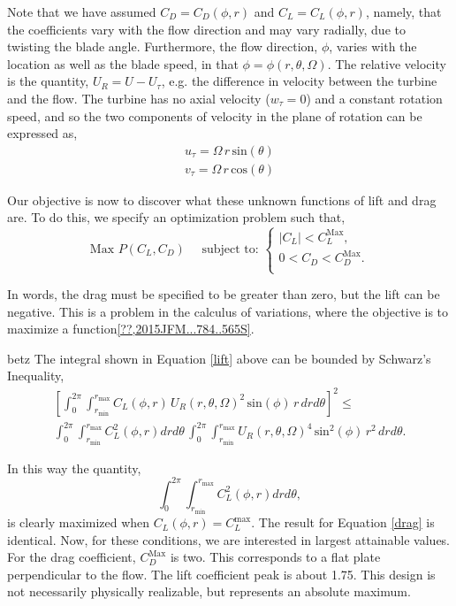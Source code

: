 Note that we have assumed $C_D = C_D(\phi,r)$ and $C_L = C_L(\phi,r)$,
namely, that the coefficients vary with the flow direction and may vary
radially, due to twisting the blade angle. Furthermore, the flow
direction, $\phi$, varies with the location as well as the blade speed,
in that $\phi=\phi(r,\theta,\Omega)$. The relative velocity is the
quantity, $U_R = U - U_\tau$, e.g. the difference in velocity between
the turbine and the flow. The turbine has no axial velocity ($w_\tau =
0$) and a constant rotation speed, and so the two components of velocity
in the plane of rotation can be expressed as,
\begin{align}
 u_\tau = \Omega \,r\, \text{sin}(\theta)\\
 v_\tau = \Omega \,r\, \text{cos}(\theta)
\end{align}

Our objective is now to discover what these unknown functions of lift
and drag are. To do this, we specify an optimization problem such that, 
\begin{equation*} 
 \text{Max } P(C_L,C_D) \quad \text{ subject to: }
  \begin{cases}
   |C_L| < C_L^{\text{Max}}, \\
   0 < C_D < C_D^{\text{Max}}. \\
  \end{cases}
\end{equation*}

In words, the drag must be specified to be greater than zero, but
the lift can be negative. This is a problem in the calculus of
variations, where the objective is to maximize a
function\ref{??,2015JFM...784..565S}. 

%
betz%
The integral shown in Equation \ref{lift} above can be bounded by 
Schwarz's Inequality,  
\begin{align*}
  \left[
    \int_0^{2\pi}
    \int_{r_{\text{min}}}^{r_{\text{max}}} C_L(\phi,r)\, U_R(r,\theta,\Omega)^2
 \,\text{sin}(\phi)\, r\,dr d\theta \right]^2 \le \\
  \int_0^{2\pi} \int_{r_{\text{min}}}^{r_{\text{max}}} C_L^2(\phi,r) dr d\theta\,
  \int_0^{2\pi} \int_{r_{\text{min}}}^{r_{\text{max}}} U_R(r,\theta,\Omega)^4 
 \,\text{sin}^2(\phi)\, r^2\,dr d\theta.
\end{align*}

In this way the quantity,
\begin{equation}
  \int_0^{2\pi}
 \int_{r_{\text{min}}}^{r_{\text{max}}} C_L^2(\phi,r) dr d\theta, 
\end{equation}
is clearly maximized when $C_L(\phi,r) = C_L^{\text{max}}$. 
The result for Equation \ref{drag} is identical. Now, for these
conditions, we are interested in largest attainable values. For the drag
coefficient, $C_D^{\text{Max}}$ is two. %
This corresponds to a flat plate perpendicular to the flow.
The lift coefficient peak is about 1.75. This design is not necessarily
physically realizable, but represents an absolute maximum. 


